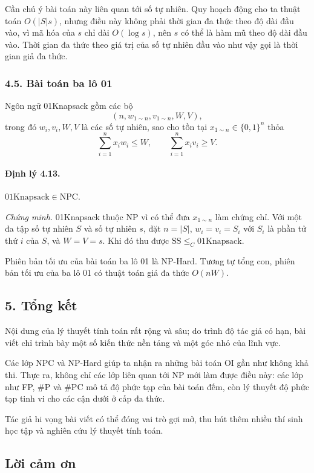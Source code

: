 \documentclass[11pt]{article}
\begin{document}
Cần chú ý bài toán này liên quan tới số tự nhiên. Quy hoạch động cho ta thuật
toán \(O(|S|s)\), nhưng điều này không phải thời gian đa thức theo độ dài đầu
vào, vì mã hóa của \(s\) chỉ dài \(O(\log s)\), nên \(s\) có thể là hàm mũ theo
độ dài đầu vào. Thời gian đa thức theo giá trị của số tự nhiên đầu vào như vậy
gọi là thời gian giả đa thức.

\subsubsection*{4.5. Bài toán ba lô 01}

Ngôn ngữ 01Knapsack gồm các bộ
\[
  (n,w_{1\sim n},v_{1\sim n},W,V),
\]
trong đó \(w_i,v_i,W,V\) là các số tự nhiên, sao cho tồn tại
\(x_{1\sim n}\in\{0,1\}^n\) thỏa
\[
  \sum_{i=1}^{n}x_iw_i\le W,\qquad
  \sum_{i=1}^{n}x_iv_i\ge V.
\]

\paragraph{Định lý 4.13.}
\(\mathrm{01Knapsack}\in\mathrm{NPC}\).

\emph{Chứng minh.}
01Knapsack thuộc NP vì có thể đưa \(x_{1\sim n}\) làm chứng chỉ. Với một đa
tập số tự nhiên \(S\) và số tự nhiên \(s\), đặt \(n=|S|\), \(w_i=v_i=S_i\) với
\(S_i\) là phần tử thứ \(i\) của \(S\), và \(W=V=s\). Khi đó thu được
\(\mathrm{SS}\le_C\mathrm{01Knapsack}\).

Phiên bản tối ưu của bài toán ba lô 01 là NP-Hard. Tương tự tổng con, phiên bản
tối ưu của ba lô 01 có thuật toán giả đa thức \(O(nW)\).

\subsection*{5. Tổng kết}

Nội dung của lý thuyết tính toán rất rộng và sâu; do trình độ tác giả có hạn,
bài viết chỉ trình bày một số kiến thức nền tảng và một góc nhỏ của lĩnh vực.

Các lớp NPC và NP-Hard giúp ta nhận ra những bài toán OI gần như không khả thi.
Thực ra, không chỉ các lớp liên quan tới NP mới làm được điều này: các lớp như
FP, \#P và \#PC mô tả độ phức tạp của bài toán đếm, còn lý thuyết độ phức tạp
tinh vi cho các cận dưới ở cấp đa thức.

Tác giả hi vọng bài viết có thể đóng vai trò gợi mở, thu hút thêm nhiều thí
sinh học tập và nghiên cứu lý thuyết tính toán.

\subsection*{Lời cảm ơn}
\end{document}
